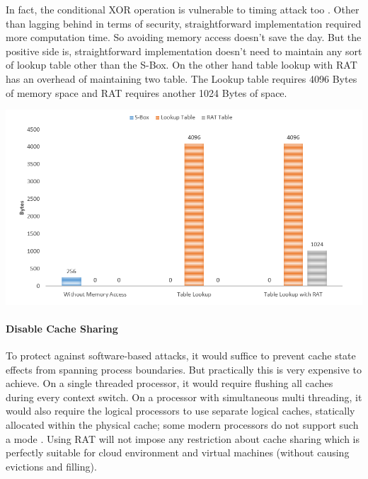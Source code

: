 In fact, the conditional XOR operation is vulnerable to timing attack too \citep{stallings5}. Other than lagging behind in terms of security, straightforward implementation required more computation time. So avoiding memory access doesn't save the day. But the positive side is, straightforward implementation doesn't need to maintain any sort of lookup table other than the S-Box. On the other hand table lookup with RAT has an overhead of maintaining two table. The Lookup table requires 4096 Bytes of memory space and RAT requires another 1024 Bytes of space.

\begin{center}
\includegraphics[scale=0.4,natwidth=902,natheight=493]{Figures/performance_memory(new).png}
\label{fig: Performance Evaluation of RAT in terms of Memory Usage.}
\end{center}

\paragraph{Disable Cache Sharing}
To protect against software-based attacks, it would suffice to prevent cache state effects from spanning process boundaries. But practically this is very expensive to achieve. On a single threaded processor, it would require flushing all caches during every context switch. On a processor with simultaneous multi threading, it would also require the logical processors to use separate logical caches, statically allocated within the physical cache; some modern processors do not support such a mode \citep{osvik}. Using RAT will not impose any restriction about cache sharing which is perfectly suitable for cloud environment and virtual machines (without causing evictions and filling).

